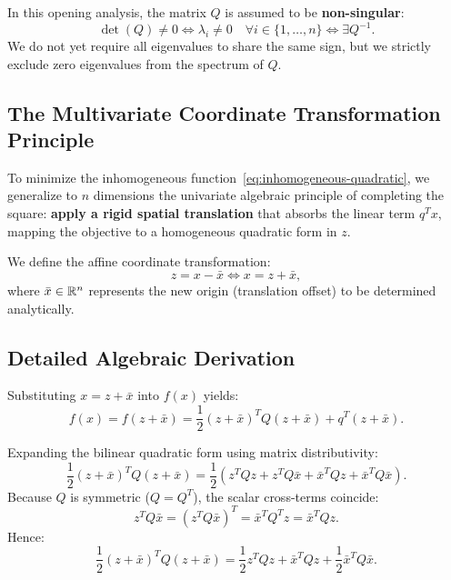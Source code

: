 In this opening analysis, the matrix $Q$ is assumed to be \textbf{non-singular}:
\begin{equation}
    \det(Q) \neq 0 \iff \lambda_i \neq 0 \quad \forall i \in \{1, \dots, n\} \iff \exists Q^{-1}.
\end{equation}
We do not yet require all eigenvalues to share the same sign, but we strictly exclude zero eigenvalues from the spectrum of $Q$.

\subsection{The Multivariate Coordinate Transformation Principle}
To minimize the inhomogeneous function~\eqref{eq:inhomogeneous-quadratic}, we generalize to $n$ dimensions the univariate algebraic principle of completing the square: \textbf{apply a rigid spatial translation} that absorbs the linear term $q^T x$, mapping the objective to a homogeneous quadratic form in $z$.

We define the affine coordinate transformation:
\begin{equation}
    z = x - \bar{x} \iff x = z + \bar{x},
    \label{eq:coord-shift-z}
\end{equation}
where $\bar{x} \in \mathbb{R}^n$ represents the new origin (translation offset) to be determined analytically.

\subsection{Detailed Algebraic Derivation}
Substituting $x = z + \bar{x}$ into $f(x)$ yields:
\begin{equation}
    f(x) = f(z + \bar{x}) = \frac{1}{2} (z + \bar{x})^T Q (z + \bar{x}) + q^T (z + \bar{x}).
\end{equation}

Expanding the bilinear quadratic form using matrix distributivity:
\begin{equation}
    \frac{1}{2} (z + \bar{x})^T Q (z + \bar{x}) = \frac{1}{2} \left( z^T Q z + z^T Q \bar{x} + \bar{x}^T Q z + \bar{x}^T Q \bar{x} \right).
\end{equation}
Because $Q$ is symmetric ($Q = Q^T$), the scalar cross-terms coincide:
\begin{equation}
    z^T Q \bar{x} = (z^T Q \bar{x})^T = \bar{x}^T Q^T z = \bar{x}^T Q z.
\end{equation}
Hence:
\begin{equation}
    \frac{1}{2} (z + \bar{x})^T Q (z + \bar{x}) = \frac{1}{2} z^T Q z + \bar{x}^T Q z + \frac{1}{2} \bar{x}^T Q \bar{x}.
\end{equation}

